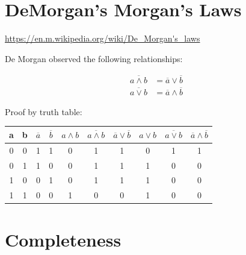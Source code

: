 \documentclass[10pt]{article}
\begin{document}
\section{DeMorgan's Morgan's Laws}

\url{https://en.m.wikipedia.org/wiki/De_Morgan's_laws}


De Morgan observed the following relationships:

%

\begin{align}
\overline{a \land b} &= \overline{a} \lor \overline{b} \\
\overline{a \lor b} &= \overline{a} \land \overline{b}
\end{align}

Proof by truth table:

\begin{center}
\begin{tabular}{|cc|cccccccc|}
a & b & 
		$\overline{a}$ &
		$\overline{b}$ &
		$a\land b$ & 
		$\overline{a \land b}$ & 
		$\overline{a}\lor\overline{b}$ &
		$a \lor b$ &
		$\overline{a \lor b}$ &
		$\overline{a} \land \overline{b}$ \\
\hline
0 & 0 & 1 & 1 & 0 & 1 & 1 & 0 & 1 & 1 \\
0 & 1 & 1 & 0 & 0 & 1 & 1 & 1 & 0 & 0 \\
1 & 0 & 0 & 1 & 0 & 1 & 1 & 1 & 0 & 0 \\
1 & 1 & 0 & 0 & 1 & 0 & 0 & 1 & 0 & 0 \\
\hline
\end{tabular}
\end{center}



\section{Completeness}
\end{document}
